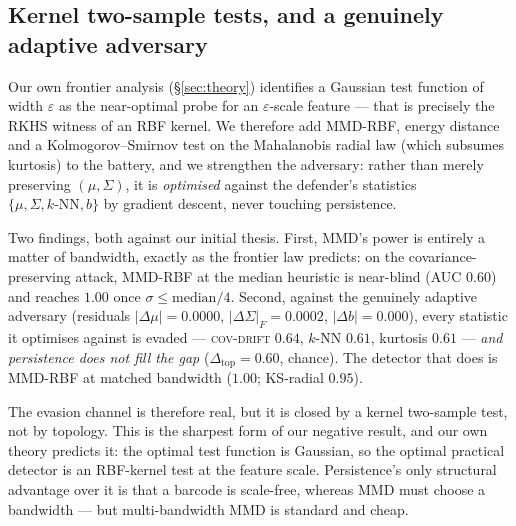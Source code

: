 \documentclass[11pt]{article}
\theoremstyle{remark}
\begin{document}
\subsection{Kernel two-sample tests, and a genuinely adaptive adversary}\label{sec:kernel}
Our own frontier analysis (\S\ref{sec:theory}) identifies a Gaussian test function of width
$\varepsilon$ as the near-optimal probe for an $\varepsilon$-scale feature --- that is precisely
the RKHS witness of an RBF kernel. We therefore add MMD-RBF, energy distance and a
Kolmogorov--Smirnov test on the Mahalanobis radial law (which subsumes kurtosis) to the battery,
and we strengthen the adversary: rather than merely preserving $(\mu,\Sigma)$, it is
\emph{optimised} against the defender's statistics $\{\mu,\Sigma,k\text{-NN},b\}$ by gradient
descent, never touching persistence.

Two findings, both against our initial thesis. First, MMD's power is entirely a matter of
bandwidth, exactly as the frontier law predicts: on the covariance-preserving attack, MMD-RBF at
the median heuristic is near-blind (AUC $0.60$) and reaches $1.00$ once
$\sigma\le\text{median}/4$. Second, against the genuinely adaptive adversary (residuals
$\lvert\Delta\mu\rvert=0.0000$, $\lvert\Delta\Sigma\rvert_F=0.0002$, $\lvert\Delta b\rvert=0.000$),
every statistic it optimises against is evaded --- \textsc{cov-drift} $0.64$, $k$-NN $0.61$,
kurtosis $0.61$ --- \emph{and persistence does not fill the gap} ($\Delta_{\mathrm{top}}=0.60$,
chance). The detector that does is MMD-RBF at matched bandwidth ($1.00$; KS-radial $0.95$).

The evasion channel is therefore real, but it is closed by a kernel two-sample test, not by
topology. This is the sharpest form of our negative result, and our own theory predicts it: the
optimal test function is Gaussian, so the optimal practical detector is an RBF-kernel test at the
feature scale. Persistence's only structural advantage over it is that a barcode is scale-free,
whereas MMD must choose a bandwidth --- but multi-bandwidth MMD is standard and cheap.
\end{document}
